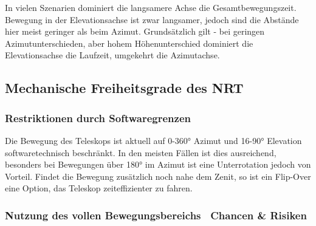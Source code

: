 In vielen Szenarien dominiert die langsamere Achse die Gesamtbewegungszeit. Bewegung in der Elevationsachse ist zwar langsamer, jedoch sind die Abstände hier meist geringer als beim Azimut.
Grundsätzlich gilt - bei geringen Azimutunterschieden, aber hohem Höhenunterschied dominiert die Elevationsachse die Laufzeit, umgekehrt die Azimutachse.

\subsection{Mechanische Freiheitsgrade des NRT}

\subsubsection{Restriktionen durch Softwaregrenzen}

Die Bewegung des Teleskops ist aktuell auf 0-360° Azimut und 16-90° Elevation softwaretechnisch beschränkt.
In den meisten Fällen ist dies ausreichend, besonders bei Bewegungen über 180° im Azimut ist eine Unterrotation jedoch von Vorteil. Findet die Bewegung zusätzlich noch nahe dem Zenit, so ist ein Flip-Over eine Option, das Teleskop zeiteffizienter zu fahren.

\subsubsection{Nutzung des vollen Bewegungsbereichs \textendash~Chancen \& Risiken}




